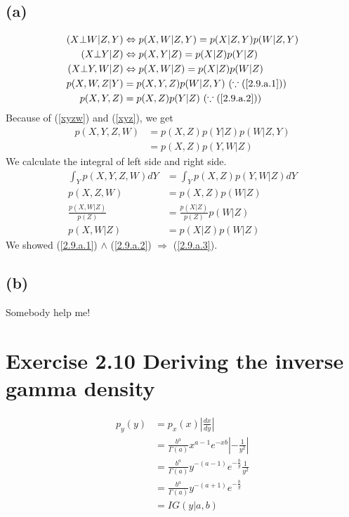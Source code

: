 \documentclass{jsarticle}
\begin{document}
\subsection*{(a)}
\begin{align}
(X \bot W|Z,Y) & \Leftrightarrow p(X,W|Z,Y) = p(X|Z,Y)p(W|Z,Y) \label{2.9.a.1} \\
(X \bot Y|Z) & \Leftrightarrow p(X,Y|Z) = p(X|Z)p(Y|Z) \label{2.9.a.2} \\
(X\bot Y,W|Z) & \Leftrightarrow p(X,W|Z) = p(X|Z)p(W|Z) \label{2.9.a.3} \\
p(X,W,Z|Y) & = p(X,Y,Z)p(W|Z,Y)\ (\because (\ref{2.9.a.1})) \label{xyzw}\\
p(X,Y,Z) & = p(X,Z)p(Y|Z)\ (\because (\ref{2.9.a.2})) \label{xyz}
\end{align}
Because of (\ref{xyzw}) and (\ref{xyz}), we get
\begin{align}
p(X,Y,Z,W) & = p(X,Z)p(Y|Z)p(W|Z,Y)\\
& = p(X,Z)p(Y,W|Z)
\end{align}
We calculate the integral of left side and right side.
\begin{align}
\int_{Y}p(X,Y,Z,W)dY & = \int_{Y}p(X,Z)p(Y,W|Z)dY\\
p(X,Z,W) & = p(X,Z)p(W|Z)\\
\frac{p(X,W|Z)}{p(Z)} & = \frac{p(X|Z)}{p(Z)}p(W|Z)\\
p(X,W|Z) & = p(X|Z)p(W|Z)
\end{align}
We showed (\ref{2.9.a.1}) $\wedge$ (\ref{2.9.a.2}) $\Rightarrow$ (\ref{2.9.a.3}).
\subsection*{(b)}
Somebody help me!

\section*{Exercise 2.10 Deriving the inverse gamma density}
\begin{align}
p_y(y) & =p_x(x)|\frac{dx}{dy}|\\
 & = \frac{b^a}{\Gamma(a)}x^{a-1}e^{-xb}|-\frac{1}{y^2}|\\
 & = \frac{b^a}{\Gamma(a)}y^{-(a-1)}e^{-\frac{b}{y}}\frac{1}{y^2}\\
 & = \frac{b^a}{\Gamma(a)}y^{-(a+1)}e^{-\frac{b}{y}}\\
 & = IG(y|a,b)
\end{align}
\end{document}
